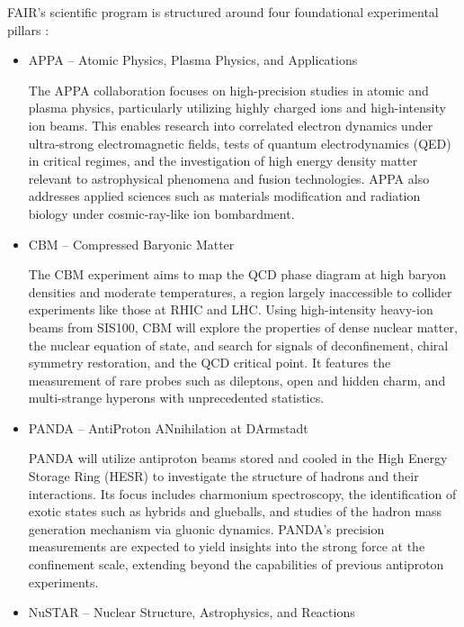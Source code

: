 FAIR's scientific program is structured around four foundational experimental pillars \cite{123_FAIR,rosner_future_2007,stoecker_fair_2011}:

\begin{itemize}
	\item APPA – Atomic Physics, Plasma Physics, and Applications \cite{APPA_2015}
	
	The APPA collaboration focuses on high-precision studies in atomic and plasma physics, particularly utilizing highly charged ions and high-intensity ion beams. This enables research into correlated electron dynamics under ultra-strong electromagnetic fields, tests of quantum electrodynamics (QED) in critical regimes, and the investigation of high energy density matter relevant to astrophysical phenomena and fusion technologies. APPA also addresses applied sciences such as materials modification and radiation biology under cosmic-ray-like ion bombardment.
	
	\item CBM – Compressed Baryonic Matter \cite{CBM_2023}
	
	The CBM experiment aims to map the QCD phase diagram at high baryon densities and moderate temperatures, a region largely inaccessible to collider experiments like those at RHIC and LHC. Using high-intensity heavy-ion beams from SIS100, CBM will explore the properties of dense nuclear matter, the nuclear equation of state, and search for signals of deconfinement, chiral symmetry restoration, and the QCD critical point. It features the measurement of rare probes such as dileptons, open and hidden charm, and multi-strange hyperons with unprecedented statistics.
	
	\item PANDA – AntiProton ANnihilation at DArmstadt \cite{PANDA_2013}
	
	PANDA will utilize antiproton beams stored and cooled in the High Energy Storage Ring (HESR) to investigate the structure of hadrons and their interactions. Its focus includes charmonium spectroscopy, the identification of exotic states such as hybrids and glueballs, and studies of the hadron mass generation mechanism via gluonic dynamics. PANDA's precision measurements are expected to yield insights into the strong force at the confinement scale, extending beyond the capabilities of previous antiproton experiments.
	
	\item NuSTAR – Nuclear Structure, Astrophysics, and Reactions \cite{NUSTAR_2015}
	

\end{itemize}
